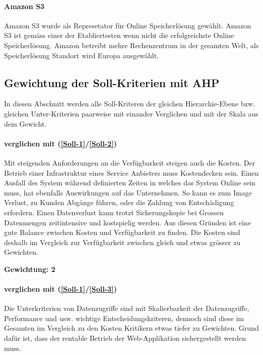 \paragraph{Amazon S3}\label{Al-5}
Amazon S3 wurde als Represetator für Online Speicherlösung gewählt. Amazon S3 ist gemäss  einer der Etabliertesten wenn nicht die erfolgreichste Online Speicherlösung. Amazon betreibt mehre Rechenzentrum in der gesamten Welt, als Speicherlösung Standort wird Europa ausgewählt.


\subsection{Gewichtung der Soll-Kriterien mit AHP}

In diesen Abschnitt werden alle Soll-Kriteren der gleichen Hierarchie-Ebene bzw.  gleichen Unter-Kriterien paarweise mit einander Verglichen und mit der Skala  aus dem  Gewicht.

\paragraph*{ verglichen mit  (\ref{Soll-1}/\ref{Soll-2})} 
Mit steigenden Anforderungen an die Verfügbarkeit steigen auch die Kosten. Der Betrieb einer Infrastruktur eines Service Anbieters muss Kostendecken sein. Einen Ausfall des System während definierten Zeiten in welches das System Online sein muss, hat ebenfalls Auswirkungen auf das Unternehmen. So kann es zum Image Verlust, zu Kunden Abgänge führen, oder die Zahlung von Entschädigung erfordern. Einen Datenverlust kann trotzt Sicherungskopie bei Grossen Datenmengen zeitintensive und kostspielig werden. Aus diesen Gründen ist eine gute Balance zwischen Kosten und Verfügbarkeit zu finden. Die Kosten sind deshalb im Vergleich zur Verfügbarkeit zwischen gleich und etwas grösser zu Gewichten.

\textbf{Gewichtung: 2}

\paragraph*{ verglichen mit  (\ref{Soll-1}/\ref{Soll-3})}
Die Unterkriterien von Datenzugriffe sind mit Skalierbarkeit der Datenzugriffe, Performance und usw. wichtige Entscheidungskriteren, dennoch sind diese im Gesamten im Vergleich zu den Kosten Kritikern etwas tiefer zu Gewichten. Grund dafür ist, dass der rentable Betrieb der Web-Applikation sichergestellt werden muss.

